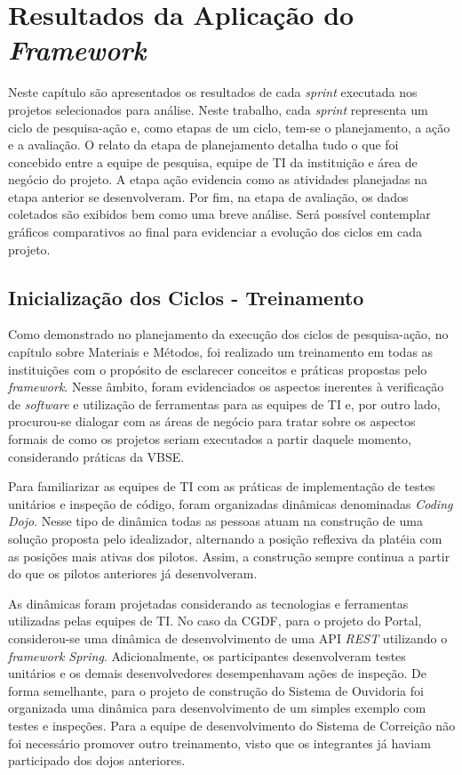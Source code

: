 \chapter{Resultados da Aplicação do \textit{Framework}}

Neste capítulo são apresentados os resultados de cada \textit{sprint} executada nos projetos selecionados para análise. Neste trabalho, cada \textit{sprint} representa um ciclo de pesquisa-ação e, como etapas de um ciclo, tem-se o planejamento, a ação e a avaliação. O relato da etapa de planejamento detalha tudo o que foi concebido entre a equipe de pesquisa, equipe de TI da instituição e área de negócio do projeto. A etapa ação evidencia como as atividades planejadas na etapa anterior se desenvolveram. Por fim, na etapa de avaliação, os dados coletados são exibidos bem como uma breve análise. Será possível contemplar gráficos comparativos ao final para evidenciar a evolução dos ciclos em cada projeto.

\section{Inicialização dos Ciclos - Treinamento}

Como demonstrado no planejamento da execução dos ciclos de pesquisa-ação, no capítulo sobre Materiais e Métodos, foi realizado um treinamento em todas as instituições com o propósito de esclarecer conceitos e práticas propostas pelo \textit{framework}. Nesse âmbito, foram evidenciados os aspectos inerentes à verificação de \textit{software} e utilização de ferramentas para as equipes de TI e, por outro lado, procurou-se dialogar com as áreas de negócio para tratar sobre os aspectos formais de como os projetos seriam executados a partir daquele momento, considerando práticas da VBSE.

Para familiarizar as equipes de TI com as práticas de implementação de testes unitários e inspeção de código, foram organizadas dinâmicas denominadas \textit{Coding Dojo}. Nesse tipo de dinâmica todas as pessoas atuam na construção de uma solução proposta pelo idealizador, alternando a posição reflexiva da platéia com as posições mais ativas dos pilotos. Assim, a construção sempre continua a partir do que os pilotos anteriores já desenvolveram.

As dinâmicas foram projetadas considerando as tecnologias e ferramentas utilizadas pelas equipes de TI. No caso da CGDF, para o projeto do Portal, considerou-se uma dinâmica de desenvolvimento de uma API \textit{REST} utilizando o \textit{framework Spring}. Adicionalmente, os participantes desenvolveram testes unitários e os demais desenvolvedores desempenhavam ações de inspeção. De forma semelhante, para o projeto de construção do Sistema de Ouvidoria foi organizada uma dinâmica para desenvolvimento de um simples exemplo com testes e inspeções. Para a equipe de desenvolvimento do Sistema de Correição não foi necessário promover outro treinamento, visto que os integrantes já haviam participado dos dojos anteriores.

